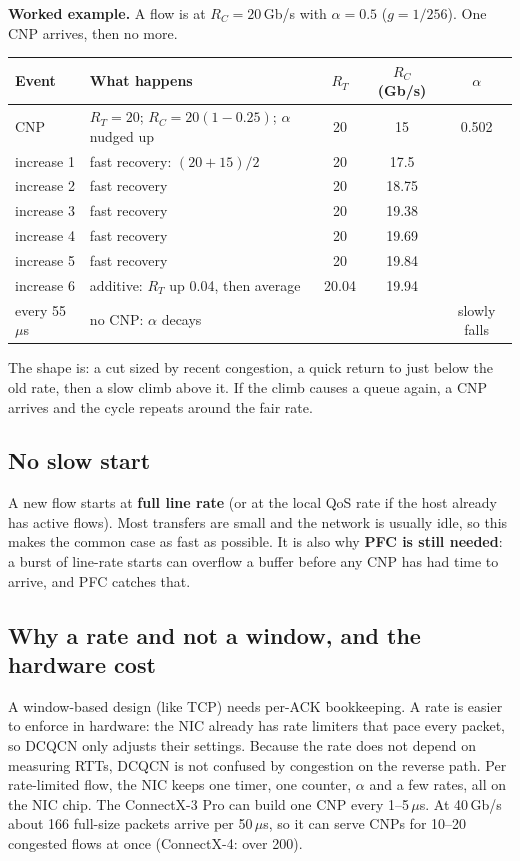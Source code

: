 \textbf{Worked example.} A flow is at $R_C = 20$\,Gb/s with $\alpha = 0.5$ ($g = 1/256$). One CNP arrives, then no more.
\begin{center}
\small
\begin{tabular}{@{}llccc@{}}
\toprule
Event & What happens & $R_T$ & $R_C$ (Gb/s) & $\alpha$\\
\midrule
CNP & $R_T{=}20$; $R_C = 20(1-0.25)$; $\alpha$ nudged up & 20 & 15 & 0.502\\
increase 1 & fast recovery: $(20+15)/2$ & 20 & 17.5 & \\
increase 2 & fast recovery & 20 & 18.75 & \\
increase 3 & fast recovery & 20 & 19.38 & \\
increase 4 & fast recovery & 20 & 19.69 & \\
increase 5 & fast recovery & 20 & 19.84 & \\
increase 6 & additive: $R_T$ up 0.04, then average & 20.04 & 19.94 & \\
every 55\,$\mu$s & no CNP: $\alpha$ decays & & & slowly falls\\
\bottomrule
\end{tabular}
\end{center}
The shape is: a cut sized by recent congestion, a quick return to just below the old rate, then a slow climb above it. If the climb
causes a queue again, a CNP arrives and the cycle repeats around the fair rate.

\subsection{No slow start}
A new flow starts at \textbf{full line rate} (or at the local QoS rate if the host already has active flows). Most transfers are small and the network
is usually idle, so this makes the common case as fast as possible. It is also why \textbf{PFC is still needed}: a burst of line-rate starts can
overflow a buffer before any CNP has had time to arrive, and PFC catches that.

\subsection{Why a rate and not a window, and the hardware cost}
A window-based design (like TCP) needs per-ACK bookkeeping. A rate is easier to enforce in hardware: the NIC already has rate limiters that pace
every packet, so DCQCN only adjusts their settings. Because the rate does not depend on measuring RTTs, DCQCN is not confused by congestion
on the reverse path. Per rate-limited flow, the NIC keeps one timer, one counter, $\alpha$ and a few rates, all on the NIC chip. The ConnectX-3
Pro can build one CNP every 1--5\,$\mu$s. At 40\,Gb/s about 166 full-size packets arrive per 50\,$\mu$s, so it can serve CNPs for 10--20
congested flows at once (ConnectX-4: over 200).

